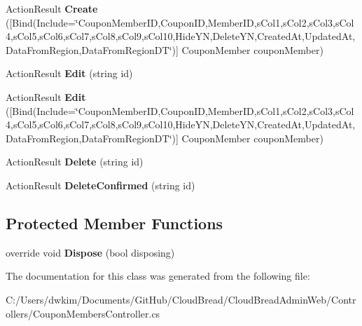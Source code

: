 \begin{DoxyCompactItemize}
\item 
Action\+Result {\bfseries Create} (\mbox{[}Bind(Include=\char`\"{}Coupon\+Member\+ID,Coupon\+ID,Member\+ID,s\+Col1,s\+Col2,s\+Col3,s\+Col4,s\+Col5,s\+Col6,s\+Col7,s\+Col8,s\+Col9,s\+Col10,Hide\+YN,Delete\+YN,Created\+At,Updated\+At,Data\+From\+Region,Data\+From\+Region\+DT\char`\"{})\mbox{]} Coupon\+Member coupon\+Member)\hypertarget{class_cloud_bread_admin_web_1_1_controllers_1_1_coupon_members_controller_a0581d1a6aa61d1b6b9cbc606b848dd5d}{}\label{class_cloud_bread_admin_web_1_1_controllers_1_1_coupon_members_controller_a0581d1a6aa61d1b6b9cbc606b848dd5d}

\item 
Action\+Result {\bfseries Edit} (string id)\hypertarget{class_cloud_bread_admin_web_1_1_controllers_1_1_coupon_members_controller_a3e73ff6ddbad554eea64cdd3d6c896b9}{}\label{class_cloud_bread_admin_web_1_1_controllers_1_1_coupon_members_controller_a3e73ff6ddbad554eea64cdd3d6c896b9}

\item 
Action\+Result {\bfseries Edit} (\mbox{[}Bind(Include=\char`\"{}Coupon\+Member\+ID,Coupon\+ID,Member\+ID,s\+Col1,s\+Col2,s\+Col3,s\+Col4,s\+Col5,s\+Col6,s\+Col7,s\+Col8,s\+Col9,s\+Col10,Hide\+YN,Delete\+YN,Created\+At,Updated\+At,Data\+From\+Region,Data\+From\+Region\+DT\char`\"{})\mbox{]} Coupon\+Member coupon\+Member)\hypertarget{class_cloud_bread_admin_web_1_1_controllers_1_1_coupon_members_controller_a9372b4773c6a02aa4bc8789735092d22}{}\label{class_cloud_bread_admin_web_1_1_controllers_1_1_coupon_members_controller_a9372b4773c6a02aa4bc8789735092d22}

\item 
Action\+Result {\bfseries Delete} (string id)\hypertarget{class_cloud_bread_admin_web_1_1_controllers_1_1_coupon_members_controller_ae64ce9b82684a7a0dca6cf7dd399cc82}{}\label{class_cloud_bread_admin_web_1_1_controllers_1_1_coupon_members_controller_ae64ce9b82684a7a0dca6cf7dd399cc82}

\item 
Action\+Result {\bfseries Delete\+Confirmed} (string id)\hypertarget{class_cloud_bread_admin_web_1_1_controllers_1_1_coupon_members_controller_aa9257c01f6326837ad8a18e5886dd3bd}{}\label{class_cloud_bread_admin_web_1_1_controllers_1_1_coupon_members_controller_aa9257c01f6326837ad8a18e5886dd3bd}

\end{DoxyCompactItemize}
\subsection*{Protected Member Functions}
\begin{DoxyCompactItemize}
\item 
override void {\bfseries Dispose} (bool disposing)\hypertarget{class_cloud_bread_admin_web_1_1_controllers_1_1_coupon_members_controller_aa107d2fb5d89ed39805e30d9736314d4}{}\label{class_cloud_bread_admin_web_1_1_controllers_1_1_coupon_members_controller_aa107d2fb5d89ed39805e30d9736314d4}

\end{DoxyCompactItemize}


The documentation for this class was generated from the following file\+:\begin{DoxyCompactItemize}
\item 
C\+:/\+Users/dwkim/\+Documents/\+Git\+Hub/\+Cloud\+Bread/\+Cloud\+Bread\+Admin\+Web/\+Controllers/Coupon\+Members\+Controller.\+cs\end{DoxyCompactItemize}
